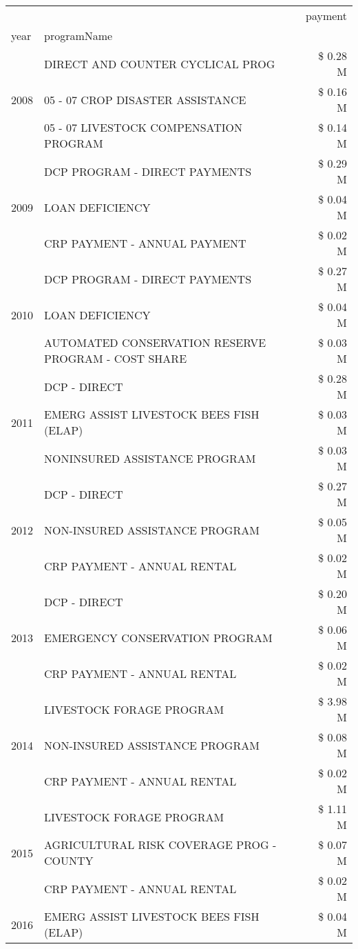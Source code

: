 \begin{tabular}{llr}
\toprule
 &  & payment \\
year & programName &  \\
\midrule
\multirow[t]{3}{*}{2008} & DIRECT AND COUNTER CYCLICAL PROG & \$ 0.28 M \\
 & 05 - 07 CROP DISASTER ASSISTANCE & \$ 0.16 M \\
 & 05 - 07 LIVESTOCK COMPENSATION PROGRAM & \$ 0.14 M \\
\cline{1-3}
\multirow[t]{3}{*}{2009} & DCP PROGRAM - DIRECT PAYMENTS & \$ 0.29 M \\
 & LOAN DEFICIENCY & \$ 0.04 M \\
 & CRP PAYMENT - ANNUAL PAYMENT & \$ 0.02 M \\
\cline{1-3}
\multirow[t]{3}{*}{2010} & DCP PROGRAM - DIRECT PAYMENTS & \$ 0.27 M \\
 & LOAN DEFICIENCY & \$ 0.04 M \\
 & AUTOMATED CONSERVATION RESERVE PROGRAM - COST SHARE & \$ 0.03 M \\
\cline{1-3}
\multirow[t]{3}{*}{2011} & DCP - DIRECT & \$ 0.28 M \\
 & EMERG ASSIST LIVESTOCK BEES FISH (ELAP) & \$ 0.03 M \\
 & NONINSURED ASSISTANCE PROGRAM & \$ 0.03 M \\
\cline{1-3}
\multirow[t]{3}{*}{2012} & DCP - DIRECT & \$ 0.27 M \\
 & NON-INSURED ASSISTANCE PROGRAM & \$ 0.05 M \\
 & CRP PAYMENT - ANNUAL RENTAL & \$ 0.02 M \\
\cline{1-3}
\multirow[t]{3}{*}{2013} & DCP - DIRECT & \$ 0.20 M \\
 & EMERGENCY CONSERVATION PROGRAM & \$ 0.06 M \\
 & CRP PAYMENT - ANNUAL RENTAL & \$ 0.02 M \\
\cline{1-3}
\multirow[t]{3}{*}{2014} & LIVESTOCK FORAGE PROGRAM & \$ 3.98 M \\
 & NON-INSURED ASSISTANCE PROGRAM & \$ 0.08 M \\
 & CRP PAYMENT - ANNUAL RENTAL & \$ 0.02 M \\
\cline{1-3}
\multirow[t]{3}{*}{2015} & LIVESTOCK FORAGE PROGRAM & \$ 1.11 M \\
 & AGRICULTURAL RISK COVERAGE PROG - COUNTY & \$ 0.07 M \\
 & CRP PAYMENT - ANNUAL RENTAL & \$ 0.02 M \\
\cline{1-3}
\multirow[t]{3}{*}{2016} & EMERG ASSIST LIVESTOCK BEES FISH (ELAP) & \$ 0.04 M \\

\end{tabular}
